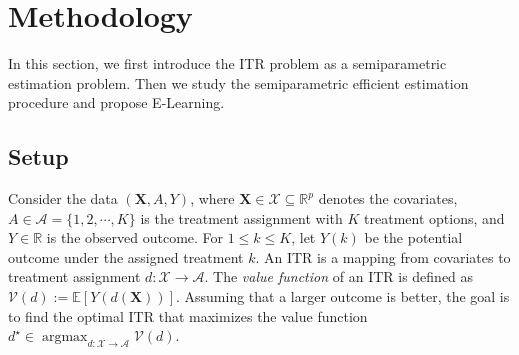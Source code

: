 \documentclass[11pt]{article}
\theoremstyle{definition}
\theoremstyle{remark}
\newcommand{\bX}{\bm{X}}
\newcommand{\bbE}{\mathbb{E}}
\newcommand{\bbR}{\mathbb{R}}
\newcommand{\cA}{\mathcal{A}}
\newcommand{\cV}{\mathcal{V}}
\newcommand{\cX}{\mathcal{X}}
\newcommand{\argmax}{\mathop{\mathrm{argmax}}}
\begin{document}
\section{Methodology}\label{sec:method}

In this section, we first introduce the ITR problem as a semiparametric estimation problem. Then we study the semiparametric efficient estimation procedure and propose E-Learning.

\subsection{Setup}\label{sec:setup}

Consider the data $ (\bX,A,Y) $, where $ \bX \in \cX \subseteq \bbR^{p} $ denotes the covariates, $ A \in \cA = \{ 1,2,\cdots,K \} $ is the treatment assignment with $ K $ treatment options, and $ Y \in \bbR $ is the observed outcome. For $ 1 \le k \le K $, let $ Y(k) $ be the potential outcome under the assigned treatment $ k $. An ITR is a mapping from covariates to treatment assignment $ d: \cX \to \cA $. The \textit{value function} of an ITR is defined as $ \cV(d) := \bbE[Y(d(\bX))] $. Assuming that a larger outcome is better, the goal is to find the optimal ITR that maximizes the value function $ d^{\star} \in \argmax_{d: \cX \to \cA}\cV(d) $. 
\end{document}

